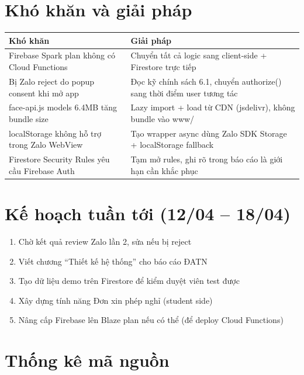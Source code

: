 \documentclass{article}
\begin{document}
\section{Khó khăn và giải pháp}

\begin{tabularx}{\textwidth}{@{}X X@{}}
\toprule
\textbf{Khó khăn} & \textbf{Giải pháp} \\
\midrule
Firebase Spark plan không có Cloud Functions & Chuyển tất cả logic sang client-side + Firestore trực tiếp \\
\addlinespace
Bị Zalo reject do popup consent khi mở app & Đọc kỹ chính sách 6.1, chuyển authorize() sang thời điểm user tương tác \\
\addlinespace
face-api.js models 6.4MB tăng bundle size & Lazy import + load từ CDN (jsdelivr), không bundle vào www/ \\
\addlinespace
localStorage không hỗ trợ trong Zalo WebView & Tạo wrapper async dùng Zalo SDK Storage + localStorage fallback \\
\addlinespace
Firestore Security Rules yêu cầu Firebase Auth & Tạm mở rules, ghi rõ trong báo cáo là giới hạn cần khắc phục \\
\bottomrule
\end{tabularx}

\section{Kế hoạch tuần tới (12/04 -- 18/04)}

\begin{enumerate}[leftmargin=1.5em]
  \item Chờ kết quả review Zalo lần 2, sửa nếu bị reject
  \item Viết chương ``Thiết kế hệ thống'' cho báo cáo ĐATN
  \item Tạo dữ liệu demo trên Firestore để kiểm duyệt viên test được
  \item Xây dựng tính năng Đơn xin phép nghỉ (student side)
  \item Nâng cấp Firebase lên Blaze plan nếu có thể (để deploy Cloud Functions)
\end{enumerate}

\section{Thống kê mã nguồn}
\end{document}
